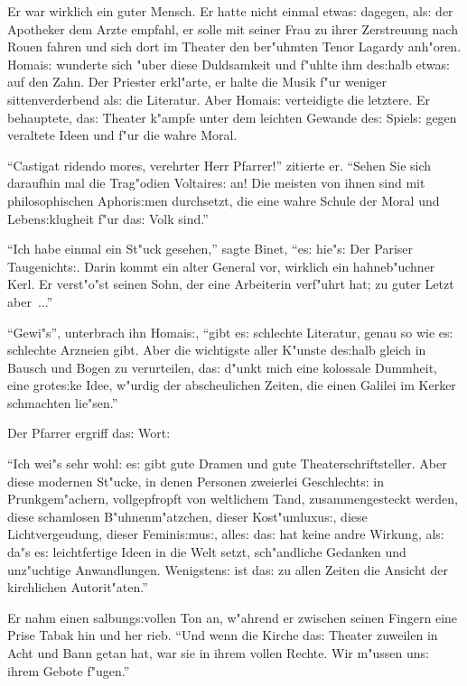 \documentclass[oneside,12pt]{book}
\newenvironment{antiqua}{\normalfont}{}%
\newcommand{\s}{s:}%
\begin{document}
Er war wirklich ein guter Mensch. Er hatte nicht einmal etwa{\s}
dagegen, al{\s} der Apotheker dem Arzte empfahl, er solle mit
seiner Frau zu ihrer Zerstreuung nach Rouen fahren und sich dort
im Theater den ber"uhmten Tenor Lagardy anh"oren. Homai{\s}
wunderte sich "uber diese Duldsamkeit und f"uhlte ihm de{\s}halb
etwa{\s} auf den Zahn. Der Priester erkl"arte, er halte die Musik
f"ur weniger sittenverderbend al{\s} die Literatur. Aber Homai{\s}
verteidigte die letztere. Er behauptete, da{\s} Theater k"ampfe
unter dem leichten Gewande de{\s} Spiel{\s} gegen veraltete Ideen
und f"ur die wahre Moral.

"`\begin{antiqua}Castigat ridendo mores\end{antiqua}, verehrter
Herr Pfarrer!"' zitierte er. "`Sehen Sie sich daraufhin mal die
Trag"odien Voltaire{\s} an! Die meisten von ihnen sind mit
philosophischen Aphori{\s}men durchsetzt, die eine wahre Schule
der Moral und Leben{\s}klugheit f"ur da{\s} Volk sind."'

"`Ich habe einmal ein St"uck gesehen,"' sagte Binet, "`e{\s}
hie"s: {\glq}Der Pariser Taugenicht{\s}.{\grq} Darin kommt ein
alter General vor, wirklich ein hahneb"uchner Kerl. Er verst"o"st
seinen Sohn, der eine Arbeiterin verf"uhrt hat; zu guter Letzt
aber~..."'

"`Gewi"s"', unterbrach ihn Homai{\s}, "`gibt e{\s} schlechte
Literatur, genau so wie e{\s} schlechte Arzneien gibt. Aber die
wichtigste aller K"unste de{\s}halb gleich in Bausch und Bogen zu
verurteilen, da{\s} d"unkt mich eine kolossale Dummheit, eine
grote{\s}ke Idee, w"urdig der abscheulichen Zeiten, die einen
Galilei im Kerker schmachten lie"sen."'

Der Pfarrer ergriff da{\s} Wort:

"`Ich wei"s sehr wohl: e{\s} gibt gute Dramen und gute
Theaterschriftsteller. Aber diese modernen St"ucke, in denen
Personen zweierlei Geschlecht{\s} in Prunkgem"achern,
vollgepfropft von weltlichem Tand, zusammengesteckt werden, diese
schamlosen B"uhnenm"atzchen, dieser Kost"umluxu{\s}, diese
Lichtvergeudung, dieser Femini{\s}mu{\s}, alle{\s} da{\s} hat
keine andre Wirkung, al{\s} da"s e{\s} leichtfertige Ideen in die
Welt setzt, sch"andliche Gedanken und unz"uchtige Anwandlungen.
Wenigsten{\s} ist da{\s} zu allen Zeiten die Ansicht der
kirchlichen Autorit"aten."'

Er nahm einen salbung{\s}vollen Ton an, w"ahrend er zwischen
seinen Fingern eine Prise Tabak hin und her rieb. "`Und wenn die
Kirche da{\s} Theater zuweilen in Acht und Bann getan hat, war sie
in ihrem vollen Rechte. Wir m"ussen un{\s} ihrem Gebote f"ugen."'
\end{document}
